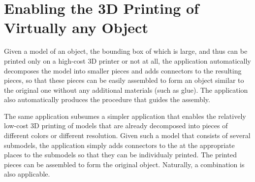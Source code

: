 \documentclass{article}
\begin{document}
\section{Enabling the 3D Printing of Virtually any Object}
\label{sec:3d-printing}
Given a model of an object, the bounding box of which is
large, and thus can be printed only on a high-cost 3D printer or not
at all, the application automatically decomposes the model into smaller
pieces and adds connectors to the resulting pieces, so that these
pieces can be easily assembled to form an object similar to the
original one without any additional materials (such as glue). The
application also automatically produces the procedure that guides the
assembly.

The same application subsumes a simpler application that enables the
relatively low-cost 3D printing of models that are already decomposed
into pieces of different colors or different resolution. Given such a
model that consists of several submodels, the application simply adds
connectors to the at the appropriate places to the submodels so that
they can be individualy printed. The printed pieces can be assembled
to form the original object. Naturally, a combination is also
applicable.

\end{document}
